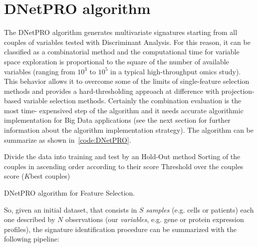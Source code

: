 \documentclass{standalone}
\begin{document}
\section[DNetPRO algorithm]{DNetPRO algorithm}\label{dnetpro:DNetPRO}

The \textsf{DNetPRO} algorithm generates multivariate signatures starting from all couples of variables tested with Discriminant Analysis.
For this reason, it can be classified as a combinatorial method and the computational time for variable space exploration is proportional to the square of the number of available variables (ranging from $10^3$ to $10^5$ in a typical high-throughput omics study).
This behavior allows it to overcome some of the limits of single-feature selection methods and provides a hard-thresholding approach at difference with projection-based variable selection methods.
Certainly the combination evaluation is the most time- expensived step of the algorithm and it needs accurate algorithmic implementation for Big Data applications (see the next section for further information about the algorithm implementation strategy).
The algorithm can be summarize as shown in~\ref{code:DNetPRO}.

\begin{algorithm}[H]
  Divide the data into training and test by an Hold-Out method\;
  Sorting of the couples in ascending order according to their score\;
  Threshold over the couples score ($K$best couples)\;
  \caption{DNetPRO algorithm for Feature Selection.}
  \label{code:DNetPRO}
\end{algorithm}

So, given an initial dataset, that consists in $S$ \emph{samples} (e.g. cells or patients) each one described by $N$ observations (our \emph{variables}, e.g. gene or protein expression profiles), the signature identification procedure can be summarized with the following pipeline:
\end{document}
